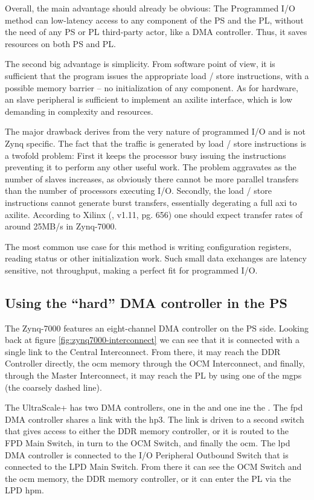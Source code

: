 Overall, the main advantage should already be obvious:
The Programmed I/O method can low-latency access to any component of the PS and the PL,
without the need of any PS or PL third-party actor, like a DMA controller. Thus, it saves
resources on both PS and PL.

The second big advantage is simplicity. From software point of view, 
it is sufficient that the program issues the appropriate load / store instructions,
with a possible memory barrier -- no initialization of any component.
As for hardware, an slave peripheral is sufficient to
implement an \gls{axilite} interface, which is low demanding in complexity and resources.

The major drawback derives from the very nature of programmed I/O and is not Zynq specific.
The fact that the traffic is generated by load / store instructions is a twofold problem:
First it keeps the processor busy issuing the instructions preventing it 
to perform any other useful work. The problem aggravates as the number of slaves increases,
as obviously there cannot be more parallel transfers than the number of processors executing I/O.
Secondly, the load / store instructions cannot generate \gls{burst} transfers,
essentially degerating a full \gls{axi} to \gls{axilite}. 
According to Xilinx (\cite{ug585}, v1.11, pg. 656) one should expect 
transfer rates of around 25MB/s in Zynq-7000.

The most common use case for this method is writing configuration registers,
reading status or other initialization work. 
Such small data exchanges are latency sensitive, not throughput,
making a perfect fit for programmed I/O.

\subsection{Using the ``hard'' DMA controller in the PS}

The Zynq-7000 features an eight-channel DMA controller on the PS side.
Looking back at figure \ref{fig:zynq7000-interconnect} we can see that it is connected
with a single link to the Central Interconnect. 
From there, it may reach the DDR Controller directly, the \gls{ocm} memory through the
OCM Interconnect, and finally, through the Master Interconnect, it may reach the PL by
using one of the \glspl{mgp} (the coarsely dashed line). 

The UltraScale+ has two DMA controllers, one in the  and one
ine the . 
The \gls{fpd} DMA controller shares a link with the \gls{hp}3. The link
is driven to a second switch that gives access to either the DDR memory controller,
or it is routed to the FPD Main Switch, in turn to the OCM Switch, and finally the \gls{ocm}.
The \gls{lpd} DMA controller is connected to the I/O Peripheral Outbound Switch that is
connected to the LPD Main Switch. From there it can see the OCM Switch and the \gls{ocm} memory,
the DDR memory controller, or it can enter the PL via the LPD \gls{hpm}.

